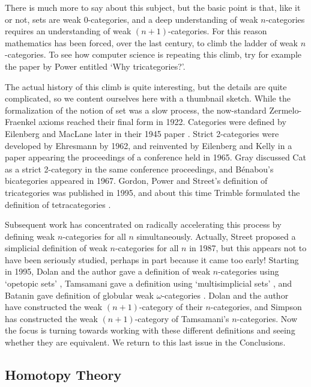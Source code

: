 There is much more to say about this subject, but the basic point is
that, like it or not, sets are weak $0$-categories, and a deep
understanding of weak $n$-categories requires an understanding of weak
$(n+1)$-categories.  For this reason mathematics has been forced, over
the last century, to climb the ladder of weak $n$-categories.  To see
how computer science is repeating this climb, try for example the paper
by Power \cite{Power3} entitled `Why tricategories?'.

The actual history of this climb is quite interesting, but the details
are quite complicated, so we content ourselves here with a
thumbnail sketch.  While the formalization of the notion of set was a
slow process, the now-standard Zermelo-Fraenkel axioms reached
their final form in 1922.  Categories were defined by Eilenberg and
MacLane later in their 1945 paper \cite{EM}.  Strict 2-categories were
developed by Ehresmann \cite{Ehresmann} by 1962, and reinvented by
Eilenberg and Kelly \cite{EK} in a paper appearing the proceedings of a
conference held in 1965.  Gray \cite{Gray} discussed Cat as a strict
2-category in the same conference proceedings, and B\'enabou's
\cite{Benabou} bicategories appeared in 1967.  Gordon, Power and
Street's definition of tricategories \cite{GPS} was published in 1995,
and about this time Trimble formulated the definition of tetracategories
\cite{Trimble}.

Subsequent work has concentrated on radically accelerating this process
by defining weak $n$-categories for all $n$ simultaneously.  Actually,
Street \cite{Street} proposed a simplicial definition of weak
$n$-categories for all $n$ in 1987, but this appears not to have been
seriously studied, perhaps in part because it came too early!  Starting
in 1995, Dolan and the author gave a definition of weak $n$-categories
using `opetopic sets' \cite{BD1,BD2}, Tamsamani gave a definition using
`multisimplicial sets' \cite{Tamsamani,Tamsamani2}, and Batanin gave
definition of globular weak $\omega$-categories
\cite{Batanin,Batanin2,Street3}.  Dolan and the author have constructed
the weak $(n+1)$-category of their $n$-categories, and Simpson
\cite{Simpson} has constructed the weak $(n+1)$-category of Tamsamani's
$n$-categories.  Now the focus is turning towards working with these
different definitions and seeing whether they are equivalent.  We return
to this last issue in the Conclusions.

\subsection{Homotopy Theory} \label{homotopy}

